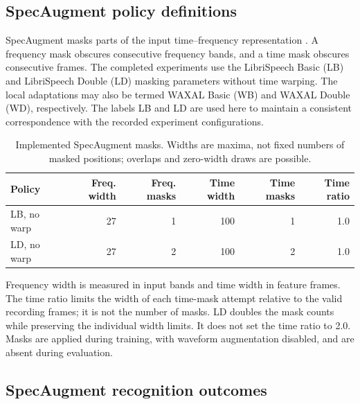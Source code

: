 \documentclass[12pt,a4paper]{report}
\begin{document}
\subsection{SpecAugment policy definitions}

SpecAugment masks parts of the input time--frequency representation \citep{Park2019}. A frequency mask obscures consecutive frequency bands, and a time mask obscures consecutive frames. The completed experiments use the LibriSpeech Basic (LB) and LibriSpeech Double (LD) masking parameters without time warping. The local adaptations may also be termed WAXAL Basic (WB) and WAXAL Double (WD), respectively. The labels LB and LD are used here to maintain a consistent correspondence with the recorded experiment configurations.

\begin{table}[htbp]\centering\small
\caption{Implemented SpecAugment masks. Widths are maxima, not fixed numbers of masked positions; overlaps and zero-width draws are possible.}\label{tab:results-masks}
\begin{tabular}{lrrrrr}\toprule
Policy & Freq. width & Freq. masks & Time width & Time masks & Time ratio\\\midrule
LB, no warp & 27 & 1 & 100 & 1 & 1.0\\
LD, no warp & 27 & 2 & 100 & 2 & 1.0\\\bottomrule
\end{tabular}\end{table}

Frequency width is measured in input bands and time width in feature frames. The time ratio limits the width of each time-mask attempt relative to the valid recording frames; it is not the number of masks. LD doubles the mask counts while preserving the individual width limits. It does not set the time ratio to 2.0. Masks are applied during training, with waveform augmentation disabled, and are absent during evaluation.

\subsection{SpecAugment recognition outcomes}
\end{document}
